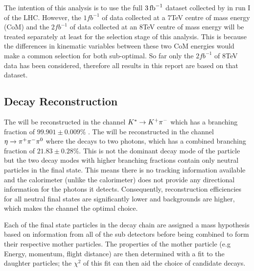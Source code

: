 The intention of this analysis is to use the full $3\mbox{\,fb}^{-1}$ dataset collected by \lhcb in run I of the LHC.  However, the $1fb^{-1}$ of data collected at a 7TeV centre of mass energy (CoM) and the $2fb^{-1}$ of data collected at an 8TeV centre of mass energy will be treated separately at least for the selection stage of this analysis.  This is because the differences in kinematic variables between these two CoM energies would make a common selection for both sub-optimal. So far only the $2fb^{-1}$ of 8TeV data has been considered, therefore all results in this report are based on that dataset.

\subsection{Decay Reconstruction}
\label{sec:Decay Reconstruction}
The \Kstar will be reconstructed in the channel ${{K}^*} \rightarrow {\ensuremath{{K}^+}}{\ensuremath{{\pi}^-}}$ which has a branching fraction of $99.901\pm0.009\%$ \cite{PDG2014}.  The \etaz will be reconstructed in the channel $\eta \rightarrow {\ensuremath{{\pi}^+}}{\ensuremath{{\pi}^-}}{\ensuremath{{\pi}^0}}$ where the \piz decays to two photons, which has a combined branching fraction of $21.83\pm0.28\%$\cite{PDG2014}.  This is not the dominant decay mode of the \etaz particle but the two decay modes with higher branching fractions contain only neutral particles in the final state.  This means there is no tracking information available and the \lhcb calorimeter (unlike the \atlas calorimeter) does not provide any directional information for the photons it detects.  Consequently, reconstruction efficiencies for all neutral final states are significantly lower and backgrounds are higher, which makes the \pip\pim\piz channel the optimal choice.  

Each of the final state particles in the decay chain are assigned a mass hypothesis based on information from all of the \lhcb sub detectors before being combined to form their respective mother particles.  The properties of the mother particle (e.g Energy, momentum, flight distance) are then determined with a fit to the daughter particles;   the $\chi^2$ of this fit can then aid the choice of candidate decays.

